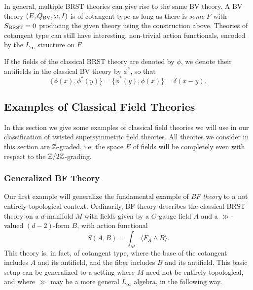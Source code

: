 \documentclass[10pt, oneside]{article}
\begin{document}
\begin{remark}
In general, multiple BRST theories can give rise to the same BV theory.  A BV theory $(E, Q_{\mathrm{BV}}, \omega, I)$ is of cotangent type as long as there is \emph{some} $F$ with $S_{\mathrm{BRST}} = 0$ producing the given theory using the construction above.  Theories of cotangent type can still have interesting, non-trivial action functionals, encoded by the $L_\infty$ structure on $F$.
\end{remark}

If the fields of the classical BRST theory are denoted by $\phi$, we denote their antifields in the classical BV theory by $\phi^*$, so that
\[\{\phi(x), \phi^*(y)\} = \{\phi^*(y), \phi(x)\} = \delta(x-y).\]
 

\subsection{Examples of Classical Field Theories}

In this section we give some examples of classical field theories we will use in our classification of twisted supersymmetric field theories. All theories we consider in this section are $\mathbb Z$-graded, i.e. the space $E$ of fields will be completely even with respect to the $\mathbb Z/2\mathbb Z$-grading.

\subsubsection{Generalized BF Theory} \label{gen_BF_section}

Our first example will generalize the fundamental example of \emph{BF theory} to a not entirely topological context.  Ordinarily, BF theory describes the classical BRST theory on a $d$-manifold $M$ with fields given by a $G$-gauge field $A$ and a $\gg$-valued $(d-2)$-form $B$, with action functional
\[S(A,B) = \int_M \langle F_A \wedge B \rangle.\]
This theory is, in fact, of cotangent type, where the base of the cotangent includes $A$ and its antifield, and the fiber includes $B$ and its antifield.  This basic setup can be generalized to a setting where $M$ need not be entirely topological, and where $\gg$ may be a more general $L_\infty$ algebra, in the following way.
\end{document}
